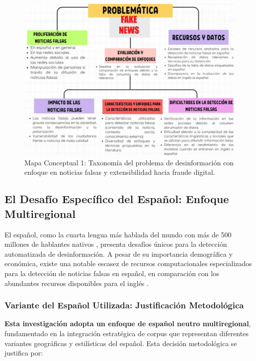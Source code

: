 \begin{figure}[h!]
    \centering
    \includegraphics[width=\textwidth]{Imagenes/mapaConceptual1.png}
    \caption{Mapa Conceptual 1: Taxonomía del problema de desinformación con enfoque en noticias falsas y extensibilidad hacia fraude digital.}
    \label{fig:mapa_problema}
\end{figure}

\subsection{El Desafío Específico del Español: Enfoque Multiregional}

El español, como la cuarta lengua más hablada del mundo con más de 500 millones de hablantes nativos \cite{acosta2019construccion}, presenta desafíos únicos para la detección automatizada de desinformación. A pesar de su importancia demográfica y económica, existe una notable escasez de recursos computacionales especializados para la detección de noticias falsas en español, en comparación con los abundantes recursos disponibles para el inglés \cite{posadas2019detection}.

\subsubsection{Variante del Español Utilizada: Justificación Metodológica}

\textbf{Esta investigación adopta un enfoque de español neutro multiregional}, fundamentado en la integración estratégica de corpus que representan diferentes variantes geográficas y estilísticas del español. Esta decisión metodológica se justifica por:

